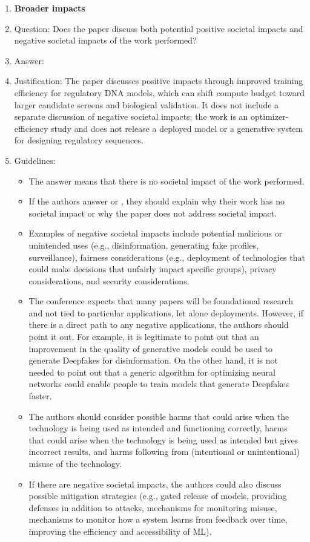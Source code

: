 \documentclass{article}
\begin{document}
\begin{enumerate}
\item {\bf Broader impacts}
    \item[] Question: Does the paper discuss both potential positive societal impacts and negative societal impacts of the work performed?
    \item[] Answer: \answerNo{} %
    \item[] Justification: The paper discusses positive impacts through improved training efficiency for regulatory DNA models, which can shift compute budget toward larger candidate screens and biological validation. It does not include a separate discussion of negative societal impacts; the work is an optimizer-efficiency study and does not release a deployed model or a generative system for designing regulatory sequences.
    \item[] Guidelines:
    \begin{itemize}
        \item The answer \answerNA{} means that there is no societal impact of the work performed.
        \item If the authors answer \answerNA{} or \answerNo, they should explain why their work has no societal impact or why the paper does not address societal impact.
        \item Examples of negative societal impacts include potential malicious or unintended uses (e.g., disinformation, generating fake profiles, surveillance), fairness considerations (e.g., deployment of technologies that could make decisions that unfairly impact specific groups), privacy considerations, and security considerations.
        \item The conference expects that many papers will be foundational research and not tied to particular applications, let alone deployments. However, if there is a direct path to any negative applications, the authors should point it out. For example, it is legitimate to point out that an improvement in the quality of generative models could be used to generate Deepfakes for disinformation. On the other hand, it is not needed to point out that a generic algorithm for optimizing neural networks could enable people to train models that generate Deepfakes faster.
        \item The authors should consider possible harms that could arise when the technology is being used as intended and functioning correctly, harms that could arise when the technology is being used as intended but gives incorrect results, and harms following from (intentional or unintentional) misuse of the technology.
        \item If there are negative societal impacts, the authors could also discuss possible mitigation strategies (e.g., gated release of models, providing defenses in addition to attacks, mechanisms for monitoring misuse, mechanisms to monitor how a system learns from feedback over time, improving the efficiency and accessibility of ML).
    \end{itemize}
    

\end{enumerate}
\end{document}

